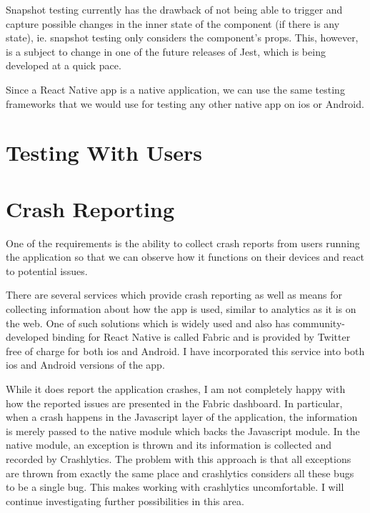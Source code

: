 Snapshot testing currently has the drawback of not being able to trigger and capture possible changes in the inner state of the component (if there is any state), ie. snapshot testing only considers the component’s props. This, however, is a subject to change in one of the future releases of Jest, which is being developed at a quick pace.

Since a React Native app is a native application, we can use the same testing frameworks that we would use for testing any other native app on ios or Android. 

\section{Testing With Users}



\section{Crash Reporting}


One of the requirements is the ability to collect crash reports from users running the application so that we can observe how it functions on their devices and react to potential issues. 

There are several services which provide crash reporting as well as means for collecting information about how the app is used, similar to analytics as it is on the web. One of such solutions which is widely used and also has community-developed binding for React Native is called Fabric and is provided by Twitter free of charge for both ios and Android. I have incorporated this service into both ios and Android versions of the app. 

While it does report the application crashes, I am not completely happy with how the reported issues are presented in the Fabric dashboard. In particular, when a crash happens in the Javascript layer of the application, the information is merely passed to the native module which backs the Javascript module. In the native module, an exception is thrown and its information is collected and recorded by Crashlytics. The problem with this approach is that all exceptions are thrown from exactly the same place and crashlytics considers all these bugs to be a single bug. This makes working with crashlytics uncomfortable. I will continue investigating further possibilities in this area. 